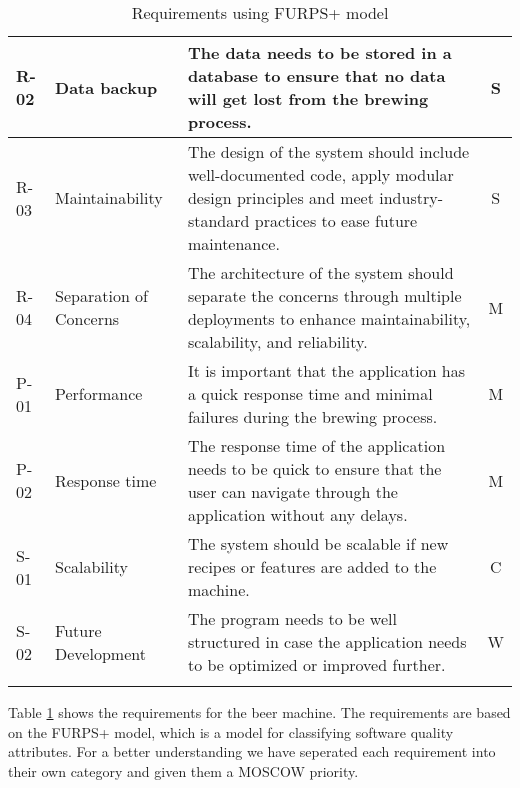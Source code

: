 \begin{center}
\begin{longtable}{|p{1cm}|p{4cm}|p{8.5cm}|c|}
        R-02   & Data backup                & The data needs to be stored in a database to ensure that no data will get lost from the brewing process.                                                           & S \\ \hline
        R-03   & Maintainability            & The design of the system should include well-documented code, apply modular design principles and meet industry-standard practices to ease future maintenance.      & S \\ \hline 
        R-04   & Separation of Concerns     & The architecture of the system should separate the concerns through multiple deployments to enhance maintainability, scalability, and reliability.             & M \\ \hline
        P-01   & Performance                & It is important that the application has a quick response time and minimal failures during the brewing process.                                                & M \\ \hline
        P-02   & Response time              & The response time of the application needs to be quick to ensure that the user can navigate through the application without any delays.                            & M \\ \hline
        S-01   & Scalability                & The system should be scalable if new recipes or features are added to the machine.                                                                  & C \\ \hline
        S-02   & Future Development         & The program needs to be well structured in case the application needs to be optimized or improved further.                                                     & W \\ \hline

        \caption{Requirements using FURPS+ model}
        \label{tab:requirements}
    \end{longtable}
\end{center}

Table \ref{tab:requirements} shows the requirements for the beer machine. The requirements are based on the FURPS+ model, which is a model for classifying software quality attributes. For a better understanding we have seperated each requirement into their own category and given them a MOSCOW priority.







